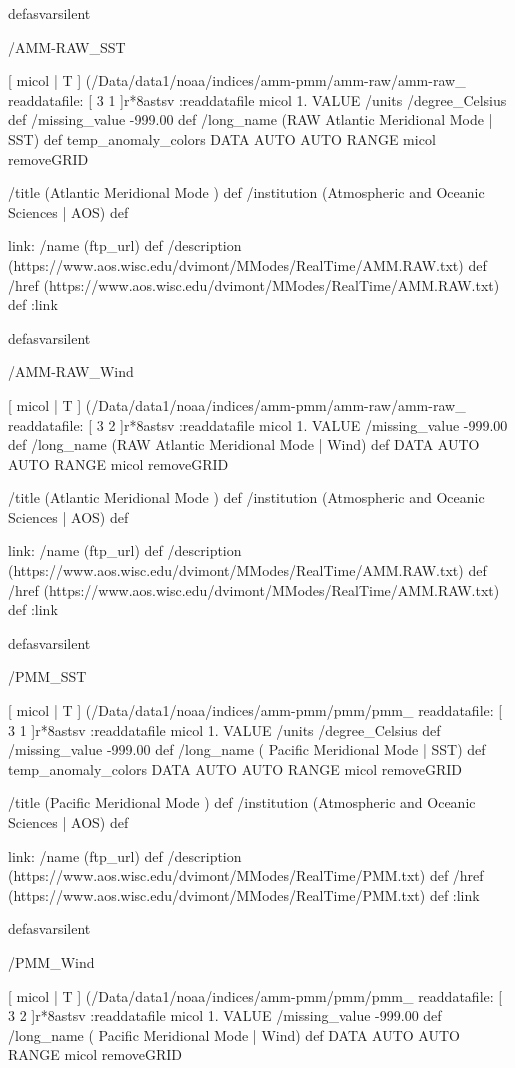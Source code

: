 \begin{ingrid}
{{}defasvarsilent

/AMM-RAW_SST { 
 [ micol | T  ]
  (/Data/data1/noaa/indices/amm-pmm/amm-raw/amm-raw_%
 readdatafile:
  [ 3 1 ]r*8astsv
 :readdatafile
   micol 1. VALUE
   /units /degree_Celsius def
   /missing_value -999.00 def 
   /long_name (RAW Atlantic Meridional Mode | SST) def
   temp_anomaly_colors
   DATA AUTO AUTO RANGE
   micol removeGRID
 
 /title (Atlantic Meridional Mode ) def
 /institution (Atmospheric and Oceanic Sciences |  AOS) def
 
 link:
  /name (ftp_url) def
  /description (https://www.aos.wisc.edu/dvimont/MModes/RealTime/AMM.RAW.txt) def
  /href (https://www.aos.wisc.edu/dvimont/MModes/RealTime/AMM.RAW.txt) def
 :link

}defasvarsilent

/AMM-RAW_Wind {
 [ micol | T  ]
  (/Data/data1/noaa/indices/amm-pmm/amm-raw/amm-raw_%
 readdatafile:
  [ 3 2 ]r*8astsv
 :readdatafile
   micol 1. VALUE
   /missing_value -999.00 def
   /long_name (RAW Atlantic Meridional Mode | Wind) def
   DATA AUTO AUTO RANGE
   micol removeGRID

 /title (Atlantic Meridional Mode ) def
 /institution (Atmospheric and Oceanic Sciences |  AOS) def

 link:
  /name (ftp_url) def
  /description (https://www.aos.wisc.edu/dvimont/MModes/RealTime/AMM.RAW.txt) def
  /href (https://www.aos.wisc.edu/dvimont/MModes/RealTime/AMM.RAW.txt) def
 :link

}defasvarsilent

/PMM_SST {
 [ micol | T  ]
  (/Data/data1/noaa/indices/amm-pmm/pmm/pmm_%
 readdatafile:
  [ 3 1 ]r*8astsv
 :readdatafile
   micol 1. VALUE
   /units /degree_Celsius def
   /missing_value -999.00 def
   /long_name ( Pacific Meridional Mode | SST) def
   temp_anomaly_colors
   DATA AUTO AUTO RANGE
   micol removeGRID

 /title (Pacific Meridional Mode ) def
 /institution (Atmospheric and Oceanic Sciences |  AOS) def

 link:
  /name (ftp_url) def
  /description (https://www.aos.wisc.edu/dvimont/MModes/RealTime/PMM.txt) def
  /href (https://www.aos.wisc.edu/dvimont/MModes/RealTime/PMM.txt) def
 :link

}defasvarsilent

/PMM_Wind {
 [ micol | T  ]
  (/Data/data1/noaa/indices/amm-pmm/pmm/pmm_%
 readdatafile:
  [ 3 2 ]r*8astsv
 :readdatafile
   micol 1. VALUE
   /missing_value -999.00 def
   /long_name ( Pacific Meridional Mode | Wind) def
   DATA AUTO AUTO RANGE
   micol removeGRID

}}
\end{ingrid}
